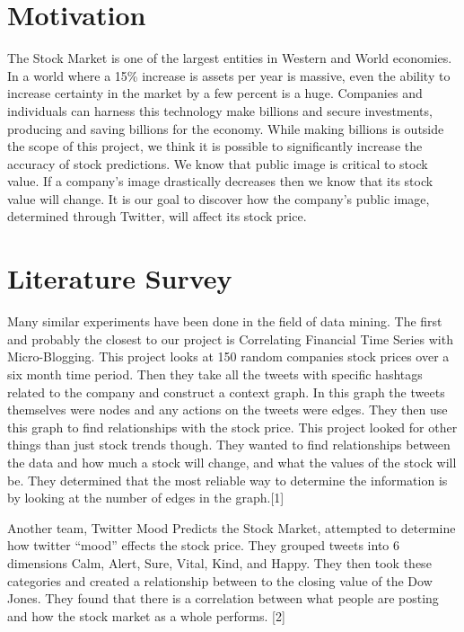 \documentclass{acm_proc_article-sp}
\begin{document}
\section{Motivation}

The Stock Market is one of the largest entities in Western
and World economies. In a world where a 15\% increase is assets per year is
massive,  even the ability to increase certainty in the market by a few percent
is a huge. Companies and individuals can harness this technology make billions
and secure investments, producing and saving billions for the economy. While
making billions is outside the scope of this project, we think it is possible
to significantly increase the accuracy of stock predictions. We know that
public image is critical to stock value. If a company's image drastically
decreases then we know that its stock value will change. It is our goal to
discover how the company's public image, determined through Twitter, will
affect its stock price.  

\section{Literature Survey}

Many similar experiments have been done in the
field of data mining. The first and probably the closest to our project is
Correlating Financial Time Series with Micro-Blogging. This project looks at
150 random companies stock prices over a six month time period. Then they take
all the tweets with specific hashtags related to the company and construct a
context graph. In this graph the tweets themselves were nodes and any actions
on the tweets were edges. They then use this graph to find relationships with
the stock price. This project looked for other things than just stock trends
though. They wanted to find relationships between the data and how much a stock
will change, and what the values of the stock will be. They determined that the
most reliable way to determine the information is by looking at the number of
edges in the graph.[1] 

Another team, Twitter Mood Predicts the Stock Market, attempted to determine
how twitter “mood” effects the stock price. They grouped tweets into 6
dimensions Calm, Alert, Sure, Vital, Kind, and Happy. They then took these
categories and created a relationship between to the closing value of the Dow
Jones. They found that there is a correlation between what people are posting
and how the stock market as a whole performs. [2] 
\end{document}
